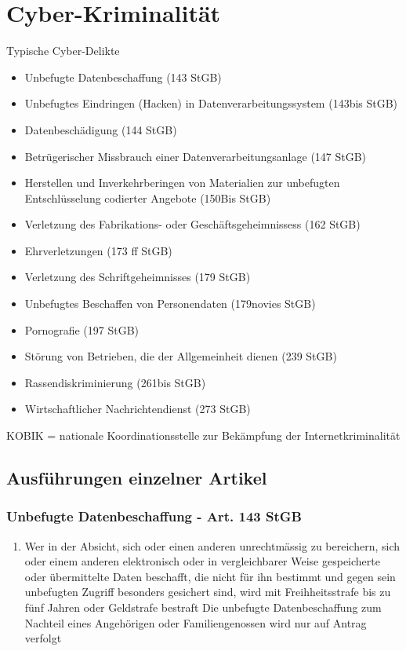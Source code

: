 \documentclass{report}
\theoremstyle{definition}
\theoremstyle{example}
\begin{document}
\chapter{Cyber-Kriminalität}

Typische Cyber-Delikte
\begin{itemize}
   \item Unbefugte Datenbeschaffung (143 StGB)
   \item Unbefugtes Eindringen (Hacken) in Datenverarbeitungssystem (143bis StGB)
   \item Datenbeschädigung (144 StGB)
   \item Betrügerischer Missbrauch einer Datenverarbeitungsanlage (147 StGB)
   \item Herstellen und Inverkehrberingen von Materialien zur unbefugten Entschlüsselung codierter Angebote (150Bis StGB)
   \item Verletzung des Fabrikations- oder Geschäftsgeheimnissess (162 StGB)
   \item Ehrverletzungen (173 ff StGB)
   \item Verletzung des Schriftgeheimnisses (179 StGB)
   \item Unbefugtes Beschaffen von Personendaten (179novies StGB)
   \item Pornografie (197 StGB)
   \item Störung von Betrieben, die der Allgemeinheit dienen (239 StGB)
   \item Rassendiskriminierung (261bis StGB)
   \item Wirtschaftlicher Nachrichtendienst (273 StGB)
\end{itemize}

KOBIK = nationale Koordinationsstelle zur Bekämpfung der Internetkriminalität

\section{Ausführungen einzelner Artikel}

\subsection{Unbefugte Datenbeschaffung - Art. 143 StGB}
\begin{enumerate}
   \item Wer in der Absicht, sich oder einen anderen unrechtmässig zu bereichern, sich oder einem anderen elektronisch oder in vergleichbarer Weise gespeicherte oder übermittelte Daten beschafft, die nicht für ihn bestimmt und  gegen sein unbefugten Zugriff besonders gesichert sind, wird mit Freihheitsstrafe bis zu fünf Jahren oder Geldstrafe bestraft Die unbefugte Datenbeschaffung zum Nachteil eines Angehörigen oder Familiengenossen wird nur auf Antrag verfolgt
\end{enumerate}
\end{document}

